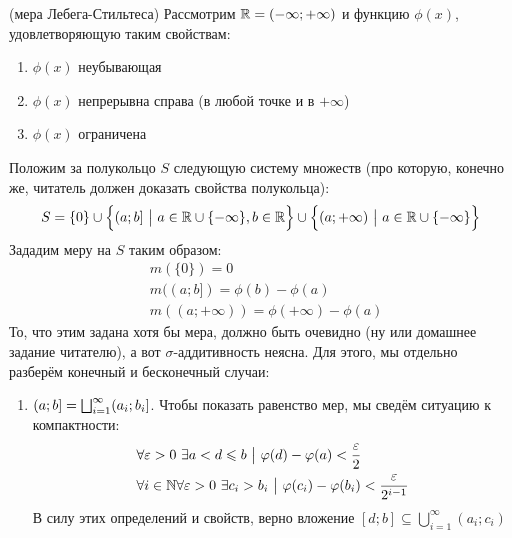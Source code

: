 \begin{example} (мера Лебега-Стильтеса)
	Рассмотрим $\mathbb{R} = (-\infty; +\infty)$ и функцию $\phi(x)$, удовлетворяющую таким свойствам:
	\begin{enumerate}
		\item $\phi(x)$ неубывающая
		
		\item $\phi(x)$ непрерывна справа (в любой точке и в $+\infty$)
		
		\item $\phi(x)$ ограничена
	\end{enumerate}
	Положим за полукольцо $S$ следующую систему множеств (про которую, конечно же, читатель должен доказать свойства полукольца):
	\[
		S = \{0\} \cup \Big\{(a; b] \ \big|\  a \in \mathbb{R} \cup \{-\infty\}, b \in \mathbb{R}\Big\} \cup \Big\{(a; +\infty) \ \big|\  a \in \mathbb{R} \cup \{-\infty\}\Big\}
	\]
	Зададим меру на $S$ таким образом:
	\begin{align*}
		&{m(\{0\}) = 0}
		\\
		&{m((a; b]) = \phi(b) - \phi(a)}
		\\
		&{m((a; +\infty)) = \phi(+\infty) - \phi(a)}
	\end{align*}
	То, что этим задана хотя бы мера, должно быть очевидно (ну или домашнее задание читателю), а вот $\sigma$-аддитивность неясна. Для этого, мы отдельно разберём конечный и бесконечный случаи:
	\begin{enumerate}
		\item $(a; b] = \bigsqcup_{i = 1}^\infty (a_i; b_i]$. Чтобы показать равенство мер, мы сведём ситуацию к компактности:
		\begin{align*}
			&{\forall \varepsilon > 0\ \exists a < d \leqslant b \ \big|\  \varphi(d) - \varphi(a) < \frac{\varepsilon}{2}}
			\\
			&{\forall i \in \mathbb{N} \forall \varepsilon > 0\ \exists c_i > b_i \ \big|\  \varphi(c_i) - \varphi(b_i) < \frac{\varepsilon}{2^{i - 1}}}
		\end{align*}
		В силу этих определений и свойств, верно вложение $[d; b] \subseteq \bigcup_{i = 1}^\infty (a_i; c_i)$
	\end{enumerate}
\end{example}